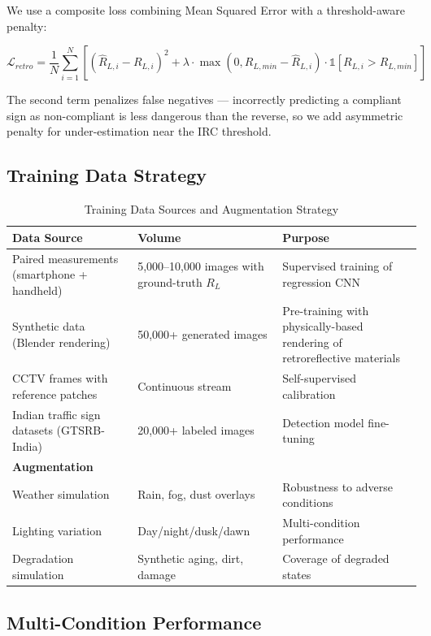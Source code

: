 \documentclass[11pt,a4paper]{article}
\begin{document}
We use a composite loss combining Mean Squared Error with a threshold-aware penalty:

\begin{equation}
\mathcal{L}_{retro} = \frac{1}{N}\sum_{i=1}^{N}\left[\left(\hat{R}_{L,i} - R_{L,i}\right)^2 + \lambda \cdot \max\left(0, R_{L,min} - \hat{R}_{L,i}\right) \cdot \mathbb{1}[R_{L,i} > R_{L,min}]\right]
\label{eq:retro_loss}
\end{equation}

The second term penalizes false negatives --- incorrectly predicting a compliant sign as non-compliant is less dangerous than the reverse, so we add asymmetric penalty for under-estimation near the IRC threshold.

\subsection{Training Data Strategy}

\begin{table}[H]
\centering
\caption{Training Data Sources and Augmentation Strategy}
\label{tab:training_data}
\begin{tabular}{@{}p{3cm}p{4cm}p{5.5cm}@{}}
\toprule
\textbf{Data Source} & \textbf{Volume} & \textbf{Purpose} \\
\midrule
Paired measurements (smartphone + handheld) & 5,000--10,000 images with ground-truth $R_L$ & Supervised training of regression CNN \\
Synthetic data (Blender rendering) & 50,000+ generated images & Pre-training with physically-based rendering of retroreflective materials \\
CCTV frames with reference patches & Continuous stream & Self-supervised calibration \\
Indian traffic sign datasets (GTSRB-India) & 20,000+ labeled images & Detection model fine-tuning \\
\midrule
\textbf{Augmentation} & & \\
Weather simulation & Rain, fog, dust overlays & Robustness to adverse conditions \\
Lighting variation & Day/night/dusk/dawn & Multi-condition performance \\
Degradation simulation & Synthetic aging, dirt, damage & Coverage of degraded states \\
\bottomrule
\end{tabular}
\end{table}

\subsection{Multi-Condition Performance}
\end{document}

